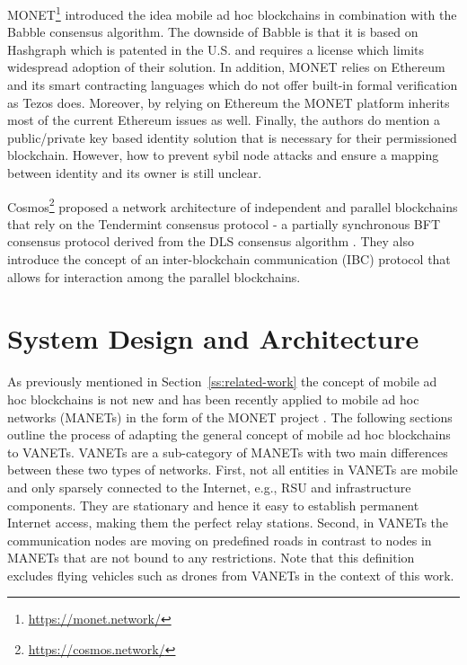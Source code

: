 \documentclass{llncs}
\begin{document}
{			MONET\footnote{\url{https://monet.network/}} \cite{monetWhitepaper} introduced the idea mobile ad hoc blockchains in combination with the Babble consensus algorithm. The downside of Babble is that it is based on Hashgraph \cite{hashgraphWhitepaper} which is patented in the U.S. and requires a license which limits widespread adoption of their solution. In addition, MONET relies on Ethereum and its smart contracting languages which do not offer built-in formal verification as Tezos does. Moreover, by relying on Ethereum the MONET platform inherits most of the current Ethereum issues as well. Finally, the authors do mention a public/private key based identity solution that is necessary for their permissioned blockchain. However, how to prevent sybil node attacks and ensure a mapping between identity and its owner is still unclear.

			Cosmos\footnote{\url{https://cosmos.network/}} \cite{cosmosWhitepaper} proposed a network architecture of independent and parallel blockchains that rely on the Tendermint consensus protocol - a partially synchronous BFT consensus protocol derived from the DLS consensus algorithm \cite{dwork1988consensus}. They also introduce the concept of an inter-blockchain communication (IBC) protocol that allows for interaction among the parallel blockchains.
			


	\section{System Design and Architecture}
		\label{s:section-3}
		
		
		As previously mentioned in Section~\ref{ss:related-work} the concept of mobile ad hoc blockchains is not new and has been recently applied to mobile ad hoc networks (MANETs) in the form of the MONET project \cite{monetWhitepaper}. The following sections outline the process of adapting the general concept of mobile ad hoc blockchains to VANETs. VANETs are a sub-category of MANETs with two main differences between these two types of networks. First, not all entities in VANETs are mobile and only sparsely connected to the Internet, e.g., RSU and infrastructure components. They are stationary and hence it easy to establish permanent Internet access, making them the perfect relay stations. Second, in VANETs the communication nodes are moving on predefined roads in contrast to nodes in MANETs that are not bound to any restrictions. Note that this definition excludes flying vehicles such as drones from VANETs in the context of this work.  
		
}
\end{document}
